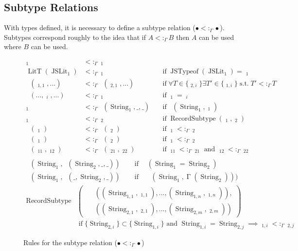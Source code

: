 \documentclass{article}
\DeclareMathOperator{\LitT}{LitT}
\DeclareMathOperator{\JSLit}{JSLit}
\DeclareMathOperator{\JSTypeof}{JSTypeof}
\DeclareMathOperator{\RecT}{RecT_\Gamma}
\DeclareMathOperator{\ObjT}{ObjT_\Gamma}
\DeclareMathOperator{\ListT}{ListT_\Gamma}
\DeclareMathOperator{\SetT}{SetT_\Gamma}
\DeclareMathOperator{\MapT}{MapT_\Gamma}
\DeclareMathOperator{\InterT}{InterT_\Gamma}
\DeclareMathOperator{\LookupObjRef}{\Gamma}
\DeclareMathOperator{\String}{String}
\DeclareMathOperator{\Type}{Type_\Gamma}
\DeclareMathOperator{\ObjectSubtype}{ObjectSubtype_\Gamma}
\DeclareMathOperator{\RecordSubtype}{RecordSubtype}
\DeclareMathOperator{\textif}{ if }
\DeclareMathOperator{\suchthat}{s.t.}
\newcommand{\subtype}{<:_\Gamma}
\begin{document}
\subsection{Subtype Relations}

With types defined, it is necessary to define a subtype 
relation (\(\bullet\subtype\bullet\)). Subtypes correspond 
roughly to the idea that if \(A\subtype B\) then \(A\)
can be used where \(B\) can be used. 

\begin{figure}
\begin{mdframed}        
\begin{align*}
    \Type_1&\subtype\Type_1 \\
    \LitT(\JSLit_1)&\subtype\Type_1 &&\textif \JSTypeof(\JSLit_1) = \Type_1 \\
    \InterT(\Type_{1,1}, ...)&\subtype\InterT(\Type_{2,1}, ...) 
    &&\textif \forall T\in \{\Type_{2,i}\} \exists T' \in \{\Type_{1,i}\} \suchthat T'\subtype T \\
    \InterT(..., \Type_i, ...)&\subtype\ObjT_1 &&\textif \ObjT_1 = \Type_i  \\
    \ObjT_1 &\subtype \ObjT(\String_1, \_, \_) &&\textif \ObjectSubtype(\String_1, \ObjT_1)\\
    \RecT_1&\subtype\RecT_2 &&\textif \RecordSubtype(\RecT_1, \RecT_2) \\
    \ListT(\Type_1)&\subtype\ListT(\Type_2) &&\textif \Type_1\subtype\Type_2 \\
    \SetT(\Type_1)&\subtype\SetT(\Type_2) &&\textif \Type_1\subtype\Type_2 \\
    \MapT(\Type_{11}, \Type_{12})&\subtype\MapT(\Type_{21}, \Type_{22}) &&\textif \Type_{11}\subtype\Type_{21} \text{ and } \Type_{12}\subtype\Type_{22} \\
\end{align*}
\begin{align*}
    \ObjectSubtype(\String_1, \ObjT(\String_2,\_, \_)) \quad &\textif 
    \quad (\String_1 = \String_2)\\
    \ObjectSubtype(\String_1, \ObjT(\_,\String_2, \_)) \quad &\textif 
    \quad \ObjectSubtype(\String_1, \LookupObjRef(\String_2)))
\end{align*}
\begin{align*}
    \RecordSubtype &\left(\begin{aligned}
        &\RecT((\String_{1,1}, \Type_{1, 1}), ..., (\String_{1,n}, \Type_{1, n})), \\
        &\RecT((\String_{2,1}, \Type_{2, 1}), ..., (\String_{2,m}, \Type_{2, m}))
    \end{aligned}\right) \\
    &\textif \{\String_{2,i}\} \subset \{\String_{1,i}\} \text{ and } \String_{1, i} = \String_{2, j} \implies \Type_{1, i} \subtype \Type_{2, j}
\end{align*}
\end{mdframed}        
    \caption{Rules for the subtype relation (\(\bullet\subtype\bullet\))}
\label{subtype-definitions}
\end{figure}
\end{document}
